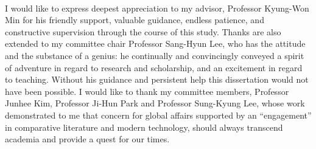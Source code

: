 \begin{center}
\\
\end{center}
I would like to express deepest appreciation to my advisor, Professor Kyung-Won Min for his friendly support, valuable guidance, endless patience, and constructive supervision through the course of this study. Thanks are also extended to my committee chair Professor Sang-Hyun Lee, who has the attitude and the substance of a genius: he continually and convincingly conveyed a spirit of adventure in regard to research and scholarship, and an excitement in regard to teaching. Without his guidance and persistent help this dissertation would not have been possible. I would like to thank my committee members, Professor Junhee Kim, Professor Ji-Hun Park and Professor Sung-Kyung Lee, whose work demonstrated to me that concern for global affairs supported by an “engagement” in comparative literature and modern technology, should always transcend academia and provide a quest for our times.



